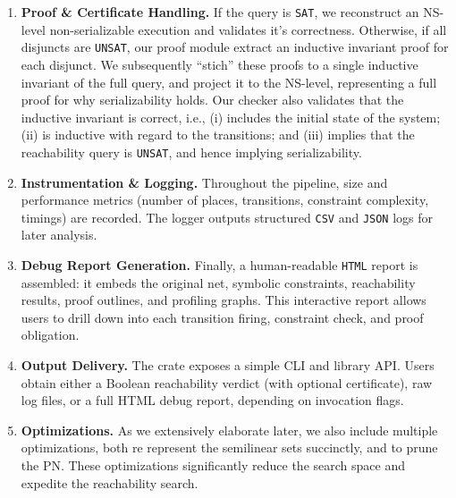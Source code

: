 \begin{enumerate}
	
	\item \textbf{Proof \& Certificate Handling.} If the query is \texttt{SAT}, we reconstruct an NS-level non-serializable execution and validates it's correctness. Otherwise, if all disjuncts are \texttt{UNSAT}, our proof module extract an inductive invariant proof for each disjunct. We subsequently ``stich'' these proofs to a single inductive invariant of the full query, and project it to the NS-level, representing a full proof for why serializability holds. Our checker also validates that the inductive invariant is correct, i.e., (i) includes the initial state of the system; (ii) is inductive with regard to the transitions; and (iii) implies that the reachability query is \texttt{UNSAT}, and hence implying serializability. 
	
	
	\item \textbf{Instrumentation \& Logging.} Throughout the pipeline, size and performance metrics (number of places, transitions, constraint complexity, timings) are recorded. The logger outputs structured \texttt{CSV} and \texttt{JSON} logs for later analysis.
	
	\item \textbf{Debug Report Generation.} Finally, a human-readable \texttt{HTML} report is assembled: it embeds the original net, symbolic constraints, reachability results, proof outlines, and profiling graphs. This interactive report allows users to drill down into each transition firing, constraint check, and proof obligation.
	
	\item \textbf{Output Delivery.} The crate exposes a simple CLI and library API. Users obtain either a Boolean reachability verdict (with optional certificate), raw log files, or a full HTML debug report, depending on invocation flags.
	
	\item \textbf{Optimizations.} As we extensively elaborate later, we also include multiple optimizations, both re represent the semilinear sets succinctly, and to prune the PN. These optimizations significantly reduce the search space and expedite the reachability search.
\end{enumerate}





